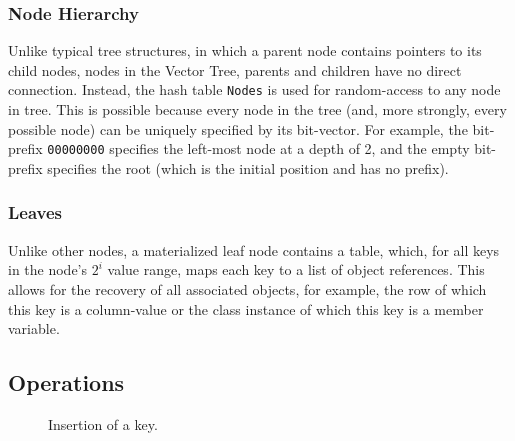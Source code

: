 \documentclass[11pt,letterpaper]{article}
\begin{document}
\subsubsection{Node Hierarchy}
Unlike typical tree structures, in which a parent node contains
pointers to its child nodes, nodes in the Vector Tree, parents and children have no
direct connection. Instead, the hash table {\tt Nodes} is used for random-access to any
node in tree.  This is possible because every node in the tree (and, more strongly,
every possible node) can be uniquely specified by its bit-vector.  For example,
the bit-prefix {\tt 00000000} specifies the left-most node at a depth of 2, and the
empty bit-prefix specifies the root (which is the initial position and has no prefix).

\subsubsection{Leaves}
Unlike other nodes, a materialized leaf node contains a table, which, for all keys
in the node's $2^i$ value range, maps each key to a list of object references.
This allows for the recovery of all associated objects, for example, the row of
which this key is a column-value or the class instance of which this key is a member
variable.




\subsection{Operations}

\begin{figure}[t]
\center
{}
\caption{Insertion of a key.}
\label{fig:insertion-diagram}
\end{figure}
\end{document}
